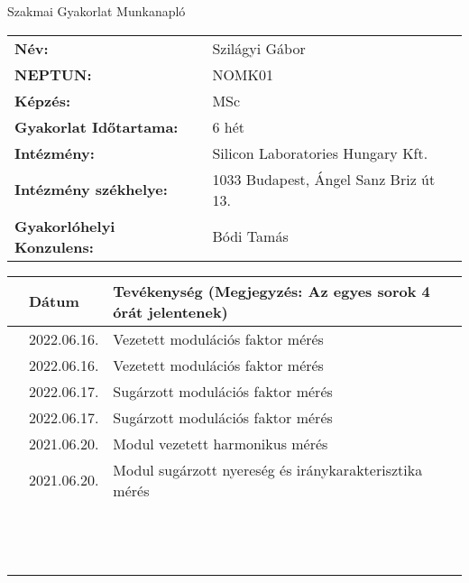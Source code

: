 \documentclass[10pt,a4paper,oneside]{report}
\newcounter{magicrownumbers}
\newcommand\rownum{\stepcounter{magicrownumbers}\arabic{magicrownumbers}}
\begin{document}
\begin{center}
	\Large{Szakmai Gyakorlat Munkanapló}
\end{center}
\begin{tabular}{p{} p{}}
	\textbf{Név:} & Szilágyi Gábor \\
	\textbf{NEPTUN:} & NOMK01 \\
	\textbf{Képzés:} & MSc \\
	\textbf{Gyakorlat Időtartama:} & 6 hét\\
	\textbf{Intézmény:} & Silicon Laboratories Hungary Kft.\\
	\textbf{Intézmény székhelye:} & 1033 Budapest, Ángel Sanz Briz út 13. \\
	\textbf{Gyakorlóhelyi Konzulens:} & Bódi Tamás
\end{tabular}
\begin{table}[h!]
	\centering
	\small
	\begin{tabular}{| c | p{3 cm} | p{10 cm} |}
	\hline
	 & Dátum & Tevékenység (Megjegyzés: Az egyes sorok 4 órát jelentenek) \\ \hline \hline
	\rownum & 2022.06.16. & Vezetett modulációs faktor mérés \\ \hline
	\rownum & 2022.06.16. & Vezetett modulációs faktor mérés \\ \hline
	\rownum & 2022.06.17. & Sugárzott modulációs faktor mérés \\ \hline
	\rownum & 2022.06.17. & Sugárzott modulációs faktor mérés \\ \hline
	\rownum & 2021.06.20. & Modul vezetett harmonikus mérés \\ \hline
	\rownum & 2021.06.20. & Modul sugárzott nyereség és iránykarakterisztika mérés  \\ \hline
	\rownum &  &  \\ \hline
	\rownum &  &  \\ \hline
	\rownum &  &  \\ \hline
	\rownum &  &  \\ \hline
	\rownum &  &  \\ \hline
	\rownum &  &  \\ \hline
	\rownum &  &  \\ \hline
	\rownum &  &  \\ \hline
	\rownum &  &  \\ \hline
	\rownum &  &  \\ \hline
	\rownum &  &  \\ \hline
	\rownum &  &  \\ \hline
	\rownum &  &  \\ \hline

\end{tabular}
\end{table}
\end{document}
